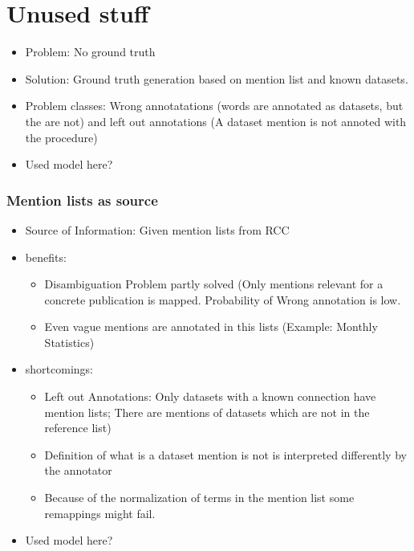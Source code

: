 \section{Unused stuff}







\begin{itemize}
    \item Problem: No ground truth
    \item Solution: Ground truth generation based on mention list and known datasets.
    \item Problem classes: Wrong annotatations (words are annotated as datasets, but the are not) and left out annotations (A dataset mention is not annoted with the procedure)
    \item Used model here?
\end{itemize}
\subsubsection{Mention lists as source}
\begin{itemize}
    \item Source of Information: Given mention lists from RCC
    \item benefits:
    \begin{itemize}
        \item Disambiguation Problem partly solved (Only mentions relevant for a concrete publication is mapped. Probability of Wrong annotation is low.
        \item Even vague mentions are annotated in this lists (Example: Monthly Statistics)
    \end{itemize}
    \item shortcomings:
    \begin{itemize}
        \item Left out Annotations: Only datasets with a known connection have mention lists; There are mentions of datasets which are not in the reference list)
        \item Definition of what is a dataset mention is not is interpreted differently by the annotator
        \item Because of the normalization of terms in the mention list some remappings might fail.
    \end{itemize}
    \item Used model here?
\end{itemize}

